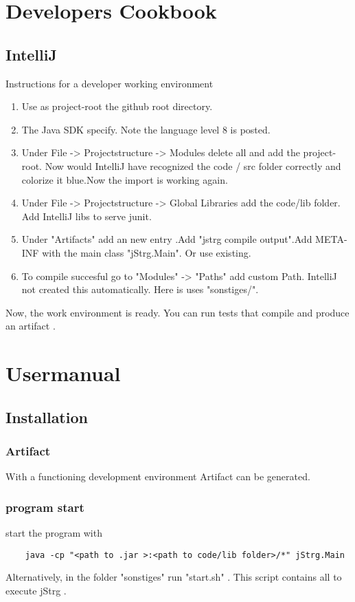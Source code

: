 \documentclass
[   oneside,         %
    12pt,            %
    DIV15,           %
    headsepline,     %
    footsepline,     %
    openright,       %
    a4paper,         %
    abstracton,      %
    titlepage,       %
    headinclude,     %
]   {scrreprt}       %
\begin{document}
	\chapter{Developers Cookbook}
	\section{IntelliJ}{Instructions for a developer working environment}
	\begin{enumerate}
		\item Use as project-root the github root directory.
		\item The Java SDK specify. Note the language level 8 is posted.
		\item Under File -> Projectstructure -> Modules delete all and add the project-root. 
Now would IntelliJ have recognized the code / src folder correctly and colorize it blue.Now the import is working again.
		\item Under File -> Projectstructure -> Global Libraries add the code/lib folder. Add IntelliJ libs to serve junit.
		\item Under "Artifacts" add an new entry .Add "jstrg compile output".Add META-INF with the main class "jStrg.Main". Or use existing.
		\item To compile succesful go to  "Modules" -> "Paths" add custom Path. IntelliJ not created this automatically. Here is uses "sonstiges/".
		
	\end{enumerate}
	
	Now, the work environment is ready. You can run tests that compile and produce an artifact .
	
	\chapter{Usermanual}
	\section{Installation}
	\subsection{Artifact}
	With a functioning development environment Artifact can be generated.
	\subsection{program start}
	start the program with
	\begin{lstlisting}
	java -cp "<path to .jar >:<path to code/lib folder>/*" jStrg.Main
	\end{lstlisting}
        Alternatively, in the folder "sonstiges" run "start.sh" . This script contains all to execute jStrg .
\end{document}
